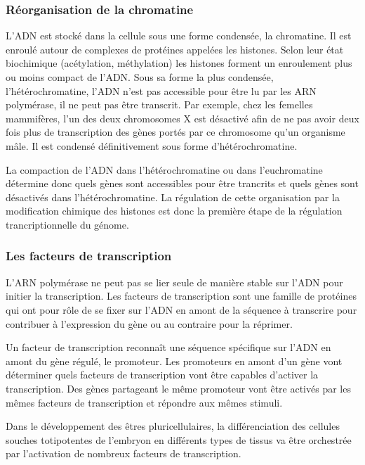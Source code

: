 \documentclass{report}
\begin{document}
\subsubsection{Réorganisation de la chromatine}

L'ADN est stocké dans la cellule sous une forme condensée, la chromatine. Il est enroulé autour de complexes de protéines appelées les histones. Selon leur état biochimique (acétylation, méthylation) les histones forment un enroulement plus ou moins compact de l'ADN. 
Sous sa forme la plus condensée, l'hétérochromatine, l'ADN n'est pas accessible pour être lu par les ARN polymérase, il ne peut pas être transcrit. Par exemple, chez les femelles mammifères, l'un des deux chromosomes X est désactivé afin de ne pas avoir deux fois plus de transcription des gènes portés par ce chromosome qu'un organisme mâle. Il est condensé définitivement sous forme d'hétérochromatine. 

La compaction de l'ADN dans l'hétérochromatine ou dans l'euchromatine détermine donc quels gènes sont accessibles pour être trancrits et quels gènes sont désactivés dans l'hétérochromatine. 
La régulation de cette organisation par la modification chimique des histones est donc la première étape de la régulation trancriptionnelle du génome. 

\subsubsection{Les facteurs de transcription}

L'ARN polymérase ne peut pas se lier seule de manière stable sur l'ADN pour initier la transcription. 
Les facteurs de transcription sont une famille de protéines qui ont pour rôle de se fixer sur l'ADN en amont de la séquence à transcrire pour contribuer à l'expression du gène ou au contraire pour la réprimer. 

Un facteur de transcription reconnaît une séquence spécifique sur l'ADN en amont du gène régulé, le promoteur. Les promoteurs en amont d'un gène vont déterminer quels facteurs de transcription vont être capables d'activer la transcription. Des gènes partageant le même promoteur vont être activés par les mêmes facteurs de transcription et répondre aux mêmes stimuli.  

Dans le développement des êtres pluricellulaires, la différenciation des cellules souches totipotentes de l'embryon en différents types de tissus va être orchestrée par l'activation de nombreux facteurs de transcription. 
\end{document}
